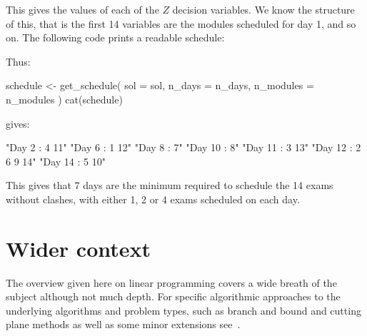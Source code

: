 This gives the values of each of the \(Z\) decision variables.
We know the structure of this, that is the first 14 variables are the modules
scheduled for day 1, and so on.
The following code prints a readable schedule:


Thus:

\begin{Rin-no-test}
schedule <- get_schedule(
    sol = sol,
    n_days = n_days,
    n_modules = n_modules
    )
cat(schedule)
\end{Rin-no-test}

gives:

\begin{Rout-no-test}

 "Day 2 : 4 11"
 "Day 6 : 1 12"
 "Day 8 : 7"
 "Day 10 : 8"
 "Day 11 : 3 13"
 "Day 12 : 2 6 9 14"
 "Day 14 : 5 10"
\end{Rout-no-test}

This gives that 7 days are the minimum required to schedule the 14 exams without
clashes, with either 1, 2 or 4 exams scheduled on each day.

\section{Wider context}\label{sec:linear_programming_wider_context}

The overview given here on linear programming covers a wide breath of the subject
although not much depth. For specific algorithmic approaches to the underlying
algorithms and problem types, such as branch and bound and cutting plane methods
as well as some minor extensions see~\parencite{conforti2014integer,
sultan2014linear}.

